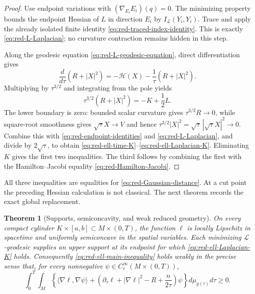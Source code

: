 \documentclass[10pt]{coll-l}
\newtheorem{theorem}{Theorem}[chapter]
\theoremstyle{definition}
\theoremstyle{remark}
\numberwithin{section}{chapter}
\numberwithin{equation}{chapter}
\begin{document}
\begin{proof}
Use endpoint variations with $(\nabla_{E_i}E_i)(q)=0$.  The minimizing
property bounds the endpoint Hessian of $L$ in direction $E_i$ by
$I_{\mathcal L}(Y_i,Y_i)$.  Trace and apply the already isolated finite
identity \eqref{eq:red-traced-index-identity}.  This is exactly
\eqref{eq:red-L-Laplacian}; no curvature contraction remains hidden in this
step.

Along the geodesic equation \eqref{eq:red-L-geodesic-equation}, direct
differentiation gives
\begin{equation}
 \frac d{d\tau}(R+|X|^2)
       =-\mathcal H(X)-\frac1\tau(R+|X|^2).              \label{eq:red-energy-Harnack-derivative}
\end{equation}
Multiplying by $\tau^{3/2}$ and integrating from the pole yields
\begin{equation}
 \tau^{3/2}(R+|X|^2)=-K+\frac12L.                       \label{eq:red-energy-K-L}
\end{equation}
The lower boundary is zero: bounded scalar curvature gives
$\tau^{3/2}R\to0$, while square-root smoothness gives
$\sqrt\tau X\to V$ and hence
$\tau^{3/2}|X|^2=\sqrt\tau\,|\sqrt\tau X|^2\to0$.
Combine this with \eqref{eq:red-endpoint-identities} and
\eqref{eq:red-L-Laplacian}, and divide by $2\sqrt\tau$, to obtain
\eqref{eq:red-ell-time-K}--\eqref{eq:red-ell-Laplacian-K}.  Eliminating
$K$ gives the first two inequalities.  The third follows by combining the
first with the Hamilton--Jacobi equality
\eqref{eq:red-Hamilton-Jacobi}.
\end{proof}

All three inequalities are equalities for
\eqref{eq:red-Gaussian-distance}.  At a cut point the preceding Hessian
calculation is not classical.  The next theorem records the exact global
replacement.

\begin{theorem}[Supports, semiconcavity, and weak reduced geometry]
\label{thm:red-weak-reduced-geometry}
On every compact cylinder $K\times[a,b]\subset M\times(0,T)$, the function
$\ell$ is locally Lipschitz in spacetime and uniformly semiconcave in the
spatial variables.  Each minimizing $\mathcal L$-geodesic supplies an upper
support at its endpoint for which
\eqref{eq:red-ell-Laplacian-K} holds.  Consequently
\eqref{eq:red-ell-main-inequality} holds weakly in the precise sense that,
for every nonnegative $\psi\in C_c^\infty(M\times(0,T))$,
\begin{equation}
 \int_0^T\!\!\int_M\left\{
  \langle\nabla\ell,\nabla\psi\rangle
 +\left(\partial_\tau\ell+|\nabla\ell|^2-R
          +\frac n{2\tau}\right)\psi\right\}
 d\mu_{g(\tau)}d\tau\geq0.                            \label{eq:red-ell-weak-test}
\end{equation}
\end{theorem}
\end{document}
